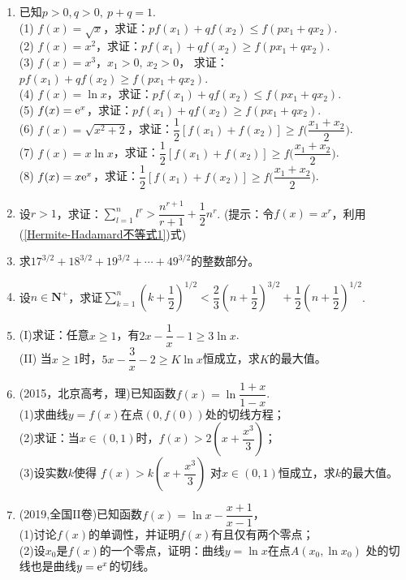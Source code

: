 \begin{enumerate}[label={\textbf{\arabic*.}},leftmargin=
    \inteval{\myenumleftmargin}pt]
\item 已知$ p>0,q>0,\ p+q=1$. \\
(1) $f(x)=\sqrt{x} $，求证：$ pf(x_1)+qf(x_2)\leq f(px_1+qx_2) $. \\
(2) $f(x)=x^2 $，求证：$ pf(x_1)+qf(x_2)\geq f(px_1+qx_2) $. \\
(3) $f(x)=x^3 $，$ x_1>0,\ x_2>0 $，
求证：$ pf(x_1)+qf(x_2)\geq f(px_1+qx_2) $. \\
(4) $f(x)=\ln x $，求证：$ pf(x_1)+qf(x_2)\leq f(px_1+qx_2) $. \\
(5) $f(x)=\mathrm{e}^x $，求证：$ pf(x_1)+qf(x_2)\geq f(px_1+qx_2) $. \\
(6) $f(x)=\sqrt{x^2+2} $，求证：$ \dfrac{1}{2}[f(x_1)+f(x_2)]\geq 
f\Big(\dfrac{x_1+x_2}{2}\Big) $. \\
(7) $f(x)=x\ln x $，求证：$ \dfrac{1}{2}[f(x_1)+f(x_2)]\geq 
f\Big(\dfrac{x_1+x_2}{2}\Big) $. \\
(8) $f(x)=x\mathrm{e}^x $，求证：$ \dfrac{1}{2}[f(x_1)+f(x_2)]\geq 
f\Big(\dfrac{x_1+x_2}{2}\Big) $. 

\item 设$ r>1 $，求证：$ \sum\limits_{l=1}^n l^r>\dfrac{n^{r+1}}{r+1}+\dfrac{1}{2}n^r $.
(提示：令$ f(x)=x^r $，利用(\ref{Hermite-Hadamard不等式1})式) 

\item 求$ 17^{3/2}+18^{3/2}+19^{3/2}+\cdots + 49^{3/2} $的整数部分。

\item 设$n\in\textbf{N}^+$，求证$\sum\limits_{k=1}^{n}
\left(k+\dfrac{1}{2}\right)^{1/2}< \dfrac{2}{3}
\left(n+\dfrac{1}{2}\right)^{3/2}+\dfrac{1}{2}
\left(n+\dfrac{1}{2}\right)^{1/2} $. 

\item (I)求证：任意$ x\geq 1 $，有$ 2x-\dfrac{1}{x}-1\geq 3\ln x $.\\
(II) 当$ x\geq 1 $时，$ 5x-\dfrac{3}{x}-2\geq K\ln x $恒成立，求$ K $的最大值。

\item (2015，北京高考，理)已知函数$ f(x)=\ln\dfrac{1+x}{1-x} $.\\
(1)求曲线$ y=f(x) $在点$ (0,f(0)) $处的切线方程；\\
(2)求证：当$ x\in(0,1) $时，$ f(x)>2\left(x+\dfrac{x^{3}}{3}\right) $；\\
(3)设实数$ k $使得 $ f(x)>k\left(x+\dfrac{x^{3}}{3}\right) $
对$ x\in(0,1) $恒成立，求$ k $的最大值。

\item 
(2019,全国II卷)已知函数$ f(x)=\ln x-\dfrac{x+1}{x-1} $，\\
(1)讨论$ f(x) $的单调性，并证明$ f(x) $有且仅有两个零点；\\
(2)设$ x_0 $是$ f(x) $的一个零点，证明：曲线$ y=\ln x $在点$ A(x_0,\ln x_0) $
处的切线也是曲线$ y=\mathrm{e}^x $的切线。


\end{enumerate}
